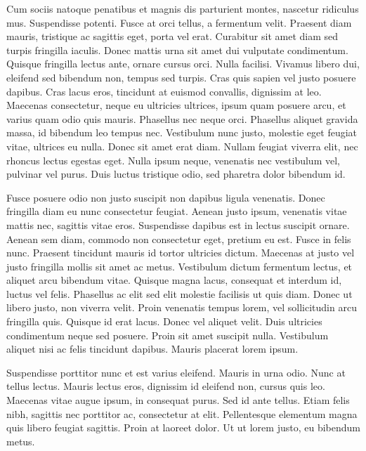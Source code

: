 Cum sociis natoque penatibus et magnis dis parturient montes, nascetur ridiculus mus.
Suspendisse potenti.
Fusce at orci tellus, a fermentum velit.
Praesent diam mauris, tristique ac sagittis eget, porta vel erat.
Curabitur sit amet diam sed turpis fringilla iaculis.
Donec mattis urna sit amet dui vulputate condimentum.
Quisque fringilla lectus ante, ornare cursus orci.
Nulla facilisi.
Vivamus libero dui, eleifend sed bibendum non, tempus sed turpis.
Cras quis sapien vel justo posuere dapibus.
Cras lacus eros, tincidunt at euismod convallis, dignissim at leo.
Maecenas consectetur, neque eu ultricies ultrices, ipsum quam posuere arcu, et varius quam odio quis mauris.
Phasellus nec neque orci.
Phasellus aliquet gravida massa, id bibendum leo tempus nec.
Vestibulum nunc justo, molestie eget feugiat vitae, ultrices eu nulla.
Donec sit amet erat diam.
Nullam feugiat viverra elit, nec rhoncus lectus egestas eget.
Nulla ipsum neque, venenatis nec vestibulum vel, pulvinar vel purus.
Duis luctus tristique odio, sed pharetra dolor bibendum id.

Fusce posuere odio non justo suscipit non dapibus ligula venenatis.
Donec fringilla diam eu nunc consectetur feugiat.
Aenean justo ipsum, venenatis vitae mattis nec, sagittis vitae eros.
Suspendisse dapibus est in lectus suscipit ornare.
Aenean sem diam, commodo non consectetur eget, pretium eu est.
Fusce in felis nunc.
Praesent tincidunt mauris id tortor ultricies dictum.
Maecenas at justo vel justo fringilla mollis sit amet ac metus.
Vestibulum dictum fermentum lectus, et aliquet arcu bibendum vitae.
Quisque magna lacus, consequat et interdum id, luctus vel felis.
Phasellus ac elit sed elit molestie facilisis ut quis diam.
Donec ut libero justo, non viverra velit.
Proin venenatis tempus lorem, vel sollicitudin arcu fringilla quis.
Quisque id erat lacus.
Donec vel aliquet velit.
Duis ultricies condimentum neque sed posuere.
Proin sit amet suscipit nulla.
Vestibulum aliquet nisi ac felis tincidunt dapibus.
Mauris placerat lorem ipsum.

Suspendisse porttitor nunc et est varius eleifend.
Mauris in urna odio.
Nunc at tellus lectus.
Mauris lectus eros, dignissim id eleifend non, cursus quis leo.
Maecenas vitae augue ipsum, in consequat purus.
Sed id ante tellus.
Etiam felis nibh, sagittis nec porttitor ac, consectetur at elit.
Pellentesque elementum magna quis libero feugiat sagittis.
Proin at laoreet dolor.
Ut ut lorem justo, eu bibendum metus.

